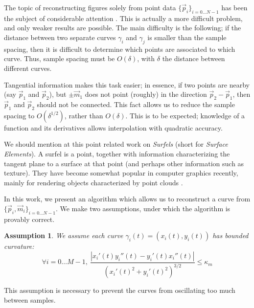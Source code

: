 \documentclass{article}
\newtheorem{assumption}{Assumption}
\numberwithin{cntr}{section}
\numberwithin{equation}{section}
\newcommand{\abs}[1]{\left| #1 \right|}%
\newcommand{\vp}[0]{{\vec{p}}}
\newcommand{\vm}[0]{{\vec{m}}}
\newcommand{\Oto}[1]{{0 \ldots #1-1}}
\newcommand{\OtoN}{{0 \ldots N-1}}
\newcommand{\pointData}{{ \{ \vp_{i} \}_{i=\OtoN} }}
\newcommand{\allData}{{ \{ \vp_{i}, \vm_{i} \}_{i=\OtoN} }}
\newcommand{\curvemax}{{\kappa_{m}}}
\newcommand{\curvesep}{{\delta}}
\begin{document}
The topic of reconstructing figures solely from point data $\pointData$ has been the subject of considerable attention \cite{amenta98crust,amenta98new,dey99curve,hoppe92surface,amenta02simple, dey01reconstructing, edelsbrunner}. This is actually a more difficult problem, and only weaker results are possible. The main difficulty is the following; if the distance between two separate curves $\gamma_{i}$ and $\gamma_{j}$ is smaller than the sample spacing, then it is difficult to determine which points are associated to which curve. Thus, sample spacing must be $O(\curvesep)$, with $\curvesep$ the distance between different curves.

Tangential information makes this task easier; in essence, if two points are nearby (say $\vp_{1}$ and $\vp_{2}$), but $\pm \vm_{1}$ does not point (roughly) in the direction $\vp_{2}-\vp_{1}$, then $\vp_{1}$ and $\vp_{2}$ should not be connected. This fact allows us to reduce the sample spacing to $O(\curvesep^{1/2})$, rather than $O(\curvesep)$. This is to be expected; knowledge of a function and its derivatives allows interpolation with quadratic accuracy.

We should mention at this point related work on \emph{Surfels} (short for \emph{Surface Elements}). A surfel is a point, together with information characterizing the tangent plane to a surface at that point (and perhaps other information such as texture). They have become somewhat popular in computer graphics recently, mainly for rendering objects characterized by point clouds
\cite{882320,1103907,598521,1018057,344936,383300}.

In this work, we present an algorithm which allows us to reconstruct a curve from $\allData$. We make two assumptions, under which the algorithm is provably correct.

\begin{assumption}
  \label{ass:curvature}
  We assume each curve $\gamma_{i}(t) = (x_i(t),y_i(t))$ has bounded curvature:
  \begin{equation}
    \label{eq:curvatureAssumption}
    \forall i = \Oto{M}, ~ \frac{
      \abs{x_{i}'(t) y_{i}''(t) - y_{i}'(t) x_{i}''(t)}
    } {
      (x_{i}'(t)^{2}+y_{i}'(t)^{2})^{3/2}
    } \leq \curvemax
  \end{equation}
\end{assumption}

This assumption is necessary to prevent the curves from oscillating too much between samples.
\end{document}
